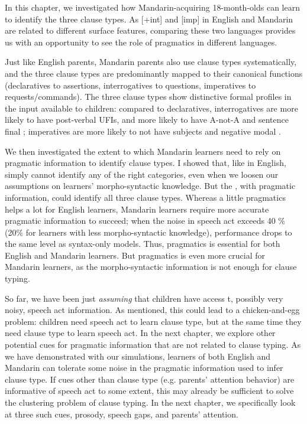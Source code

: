 In this chapter, we investigated how Mandarin-acquiring 18-month-olds can learn to identify the three clause types. As [+int] and [imp] in English and Mandarin are related to different surface features, comparing these two languages provides us with an opportunity to see the role of pragmatics in different languages.

Just like English parents, Mandarin parents also 
use clause types systematically, and the three clause types are predominantly mapped to their canonical functions (declaratives to assertions, interrogatives to questions, imperatives to requests/commands). The three clause types show distinctive formal profiles in the input available to children: compared to declaratives, interrogatives are more likely to have post-verbal UFIs, and more likely to have A-not-A and sentence final ; imperatives are more likely to not have subjects and negative modal .

We then investigated the extent to which Mandarin learners need to rely on pragmatic information to identify clause types. I showed that, like in English, \dlearnerabbr{} simply cannot identify any of the right categories, even when we loosen our assumptions on learners' morpho-syntactic knowledge. But the \plearnerabbr{}, with pragmatic information, could identify all three clause types. Whereas a little pragmatics helps a lot for English learners, Mandarin learners require more accurate pragmatic information to succeed; when the noise in speech act exceeds 40 \% (20\% for learners with less morpho-syntactic knowledge), performance drops to the same level as syntax-only models.
Thus, pragmatics is essential for both English and Mandarin learners. But pragmatics is even more crucial for Mandarin learners, as the morpho-syntactic information is not enough for clause typing. 

So far, we have been just \emph{assuming} that children have access t, possibly very noisy, speech act information. As mentioned, this could lead to a chicken-and-egg problem: children need speech act to learn clause type, but at the same time they need clause type to learn speech act. In the next chapter, we explore other potential cues for pragmatic information that are not related to clause typing. As we have demonstrated with our simulations, learners of both English and Mandarin can tolerate some noise in the pragmatic information used to infer clause type. If cues other than clause type (e.g. parents' attention behavior) are informative of speech act to some extent, this may already be sufficient to solve the clustering problem of clause typing. In the next chapter, we specifically look at three such cues, prosody, speech gaps, and parents' attention.

